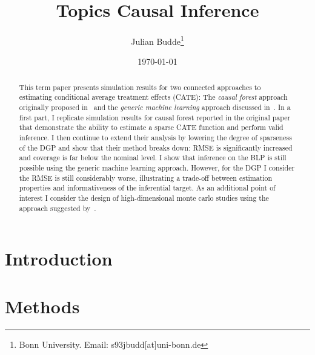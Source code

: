 \documentclass[11pt, a4paper, leqno]{article}
\title{Topics Causal Inference}
\author{Julian Budde\thanks{Bonn University. Email: s93jbudd[at]uni-bonn.de}}
\date{
    \today
}
\begin{document}
\maketitle

\begin{abstract}
    This term paper presents simulation results for two connected approaches to estimating conditional average treatment effects (CATE):
    The \textit{causal forest} approach originally proposed in~\cite{wager2018estimation} and the \textit{generic machine learning} approach discussed in~\cite{chernozhukov2023genml}.
    In a first part, I replicate simulation results for causal forest reported in the original paper that demonstrate the ability to estimate a sparse CATE function and perform valid inference.
    I then continue to extend their analysis by lowering the degree of sparseness of the DGP and show that their method breaks down: RMSE is significantly increased and coverage is far below the nominal level.
    I show that inference on the BLP is still possible using the generic machine learning approach. However, for the DGP I consider the RMSE is still considerably worse, illustrating a trade-off between estimation properties and informativeness of the inferential target.
    As an additional point of interest I consider the design of high-dimensional monte carlo studies using the approach suggested by~\cite{athey2024wgan}.
\end{abstract}

\clearpage

\section{Introduction}



\section{Methods}
\end{document}
